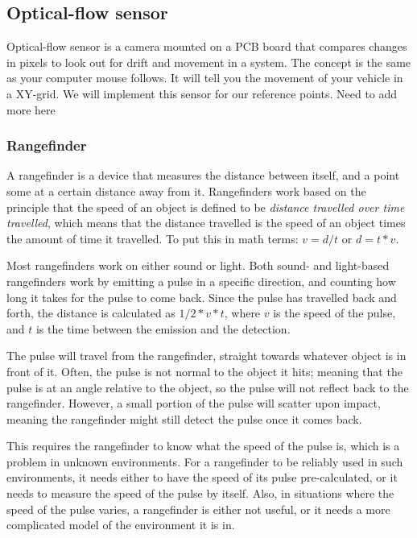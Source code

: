 \subsection{Optical-flow sensor}
Optical-flow sensor is a camera mounted on a PCB board that compares changes in pixels to look out for drift and movement in a system. The concept is the same as your computer mouse follows. It will tell you the movement of your vehicle in a XY-grid. We will implement this sensor for our reference points. Need to add more here

\subsubsection{Rangefinder}%
A rangefinder is a device that measures the distance between itself, and a point some at a certain distance away from it. Rangefinders work based on the principle that the speed of an object is defined to be \textit{distance travelled over time travelled}, which means that the distance travelled is the speed of an object times the amount of time it travelled. To put this in math terms: \(v=d/t\) or \(d=t*v\).

Most rangefinders work on either sound or light. Both sound- and light-based rangefinders work by emitting a pulse in a specific direction, and counting how long it takes for the pulse to come back. Since the pulse has travelled back and forth, the distance is calculated as \(1/2*v*t\), where \(v\) is the speed of the pulse, and \(t\) is the time between the emission and the detection.

The pulse will travel from the rangefinder, straight towards whatever object is in front of it. Often, the pulse is not normal to the object it hits; meaning that the pulse is at an angle relative to the object, so the pulse will not reflect back to the rangefinder. However, a small portion of the pulse will scatter upon impact, meaning the rangefinder might still detect the pulse once it comes back.

This requires the rangefinder to know what the speed of the pulse is, which is a problem in unknown environments. For a rangefinder to be reliably used in such environments, it needs either to have the speed of its pulse pre-calculated, or it needs to measure the speed of the pulse by itself. Also, in situations where the speed of the pulse varies, a rangefinder is either not useful, or it needs a more complicated model of the environment it is in.

